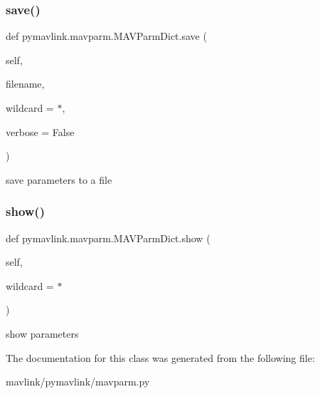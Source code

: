 \subsubsection{\texorpdfstring{save()}{save()}}
{\footnotesize\ttfamily def pymavlink.\+mavparm.\+M\+A\+V\+Parm\+Dict.\+save (\begin{DoxyParamCaption}\item[{}]{self,  }\item[{}]{filename,  }\item[{}]{wildcard = {\ttfamily \textquotesingle{}$\ast$\textquotesingle{}},  }\item[{}]{verbose = {\ttfamily False} }\end{DoxyParamCaption})}

\begin{DoxyVerb}save parameters to a file\end{DoxyVerb}
 \mbox{\label{classpymavlink_1_1mavparm_1_1MAVParmDict_a94a75c918aa0bbb2ef0b2562b9fa554e}} 
\subsubsection{\texorpdfstring{show()}{show()}}
{\footnotesize\ttfamily def pymavlink.\+mavparm.\+M\+A\+V\+Parm\+Dict.\+show (\begin{DoxyParamCaption}\item[{}]{self,  }\item[{}]{wildcard = {\ttfamily \textquotesingle{}$\ast$\textquotesingle{}} }\end{DoxyParamCaption})}

\begin{DoxyVerb}show parameters\end{DoxyVerb}
 

The documentation for this class was generated from the following file\+:\begin{DoxyCompactItemize}
\item 
mavlink/pymavlink/mavparm.\+py\end{DoxyCompactItemize}
